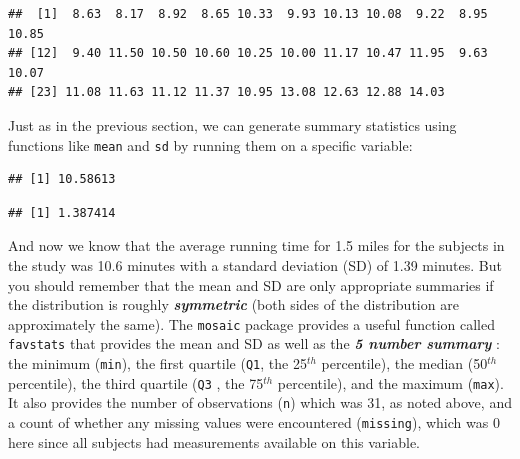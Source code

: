 \documentclass[]{book}
\newenvironment{Shaded}{\begin{snugshade}}{\end{snugshade}}
\newcommand{\KeywordTok}[1]{\textcolor[rgb]{0.13,0.29,0.53}{\textbf{{#1}}}}
\newcommand{\NormalTok}[1]{{#1}}
\begin{document}
\begin{verbatim}
##  [1]  8.63  8.17  8.92  8.65 10.33  9.93 10.13 10.08  9.22  8.95 10.85
## [12]  9.40 11.50 10.50 10.60 10.25 10.00 11.17 10.47 11.95  9.63 10.07
## [23] 11.08 11.63 11.12 11.37 10.95 13.08 12.63 12.88 14.03
\end{verbatim}

Just as in the previous section, we can generate summary statistics
using functions like \texttt{mean} and \texttt{sd} by running them on a
specific variable:

\begin{Shaded}
\end{Shaded}

\begin{verbatim}
## [1] 10.58613
\end{verbatim}

\begin{Shaded}
\end{Shaded}

\begin{verbatim}
## [1] 1.387414
\end{verbatim}

And now we know that the average running time for 1.5 miles for the
subjects in the study was 10.6 minutes with a standard deviation (SD) of
1.39 minutes. But you should remember that the mean and SD are only
appropriate summaries if the distribution is roughly
\textbf{\emph{symmetric}} (both sides of the distribution are
approximately the same). The \texttt{mosaic} package provides a useful
function called \texttt{favstats} that provides the mean and SD as well
as the \textbf{\emph{5 number summary}} : the minimum (\texttt{min}),
the first quartile (\texttt{Q1}, the 25\(^{th}\) percentile), the median
(50\(^{th}\) percentile), the third quartile (\texttt{Q3} , the
75\(^{th}\) percentile), and the maximum (\texttt{max}). It also
provides the number of observations (\texttt{n}) which was 31, as noted
above, and a count of whether any missing values were encountered
(\texttt{missing}), which was 0 here since all subjects had measurements
available on this variable.

\begin{Shaded}
\end{Shaded}
\end{document}

